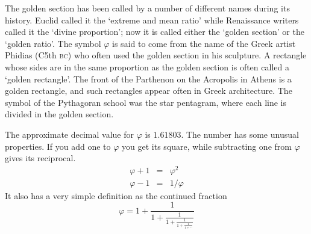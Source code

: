 \documentclass[10pt,letterpaper]{memoir}
\begin{document}
    The golden section has been called by a number of different names
during its history. Euclid
 called it the `extreme and mean ratio' while
Renaissance writers called it the `divine proportion'; now it is
called either the `golden section' or the `golden ratio'. The symbol
$\varphi$ is said to come from the name of the Greek artist 
Phidias
(C5th \textsc{bc}) who often used the golden section in his sculpture.
A rectangle whose sides are in the same proportion as the golden section
is often called a `golden rectangle'.
The front of the Parthenon on the Acropolis in Athens is a golden rectangle,
and such rectangles appear often in Greek architecture.
The symbol of the Pythagoran school was the star pentagram, 
where each line is divided in the golden section.


    The approximate decimal value for $\varphi$ is $1.61803$. 
The number has some unusual properties. If you add one to $\varphi$
you get its square, while subtracting one from $\varphi$ gives its 
reciprocal.
\begin{eqnarray}
  \varphi + 1 & = & \varphi^{2} \\
  \varphi - 1 & = & 1/\varphi
\end{eqnarray}
It also has a very simple definition as the continued fraction
\begin{equation}
\varphi = 1 + \frac{1}{\displaystyle 1 + \frac{1}{\displaystyle 1 + \frac{1}{\displaystyle 1 + \frac{1}{1 + \cdots}}}}
\end{equation}
\end{document}
